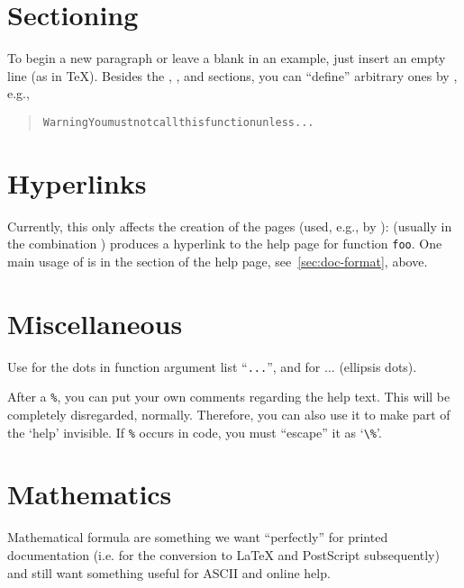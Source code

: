 \section{Sectioning}

To begin a new paragraph or leave a blank in an example, just insert an
empty line (as in \TeX{}).  Besides the ,
,  and  sections,
you can ``define'' arbitrary ones by
, e.g.,

\begin{quote}
\begin{alltt}
\LB{}Warning\RB{}\LB{}You must not call this function unless ...\RB{}
\end{alltt}
\end{quote}

\section{Hyperlinks}

Currently, this only affects the creation of the \HTML{} pages (used,
e.g., by ):  (usually in the
combination ) produces a hyperlink to the
help page for function \texttt{foo}.  One main usage of  is in
the  section of the help page, see~\ref{sec:doc-format},
above.

\section{Miscellaneous}

Use  for the dots in function argument list ``\texttt{...}'',
and  for $\ldots$ (ellipsis dots).

After a \texttt{\%}, you can put your own comments regarding the help
text. This will be completely disregarded, normally. Therefore, you can
also use it to make part of the `help' invisible.  If \texttt{\%} occurs
in \R{} code, you must ``escape'' it as `\verb|\%|'.

\section{Mathematics}

Mathematical formula are something we want ``perfectly'' for printed
documentation (i.e. for the conversion to \LaTeX{} and PostScript
subsequently) and still want something useful for ASCII and \HTML{}
online help.

